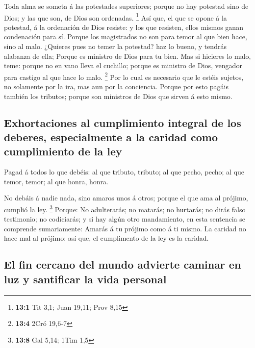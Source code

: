 Toda alma se someta á las potestades superiores; porque no
hay potestad sino de Dios; y las que son, de Dios son ordenadas.
\footnote{\textbf{13:1} Tit 3,1; Juan 19,11; Prov 8,15}  Así
que, el que se opone á la potestad, á la ordenación de Dios resiste: y
los que resisten, ellos mismos ganan condenación para sí. 
Porque los magistrados no son para temor al que bien hace, sino al malo.
¿Quieres pues no temer la potestad? haz lo bueno, y tendrás alabanza de
ella;  Porque es ministro de Dios para tu bien. Mas si
hicieres lo malo, teme: porque no en vano lleva el cuchillo; porque es
ministro de Dios, vengador para castigo al que hace lo malo. \footnote{\textbf{13:4}
  2Cró 19,6-7}  Por lo cual es necesario que le estéis
sujetos, no solamente por la ira, mas aun por la conciencia.
 Porque por esto pagáis también los tributos; porque son
ministros de Dios que sirven á esto mismo.

\hypertarget{exhortaciones-al-cumplimiento-integral-de-los-deberes-especialmente-a-la-caridad-como-cumplimiento-de-la-ley}{%
\subsection{Exhortaciones al cumplimiento integral de los deberes,
especialmente a la caridad como cumplimiento de la
ley}\label{exhortaciones-al-cumplimiento-integral-de-los-deberes-especialmente-a-la-caridad-como-cumplimiento-de-la-ley}}

 Pagad á todos lo que debéis: al que tributo, tributo; al
que pecho, pecho; al que temor, temor; al que honra, honra.

 No debáis á nadie nada, sino amaros unos á otros; porque el
que ama al prójimo, cumplió la ley. \footnote{\textbf{13:8} Gal 5,14;
  1Tim 1,5}  Porque: No adulterarás; no matarás; no
hurtarás; no dirás falso testimonio; no codiciarás; y si hay algún otro
mandamiento, en esta sentencia se comprende sumariamente: Amarás á tu
prójimo como á ti mismo.  La caridad no hace mal al
prójimo: así que, el cumplimento de la ley es la caridad.

\hypertarget{el-fin-cercano-del-mundo-advierte-caminar-en-luz-y-santificar-la-vida-personal}{%
\subsection{El fin cercano del mundo advierte caminar en luz y
santificar la vida
personal}\label{el-fin-cercano-del-mundo-advierte-caminar-en-luz-y-santificar-la-vida-personal}}

